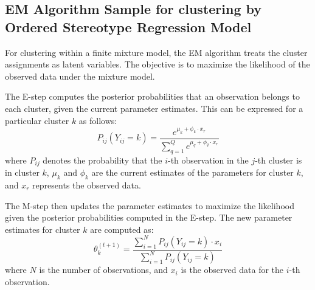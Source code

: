 \documentclass{article}
\begin{document}







\subsection{EM Algorithm Sample for clustering by Ordered Stereotype Regression Model}
For clustering within a finite mixture model, the EM algorithm treats the cluster assignments as latent variables. The objective is to maximize the likelihood of the observed data under the mixture model.

The E-step computes the posterior probabilities that an observation belongs to each cluster, given the current parameter estimates. This can be expressed for a particular cluster \( k \) as follows:
\begin{equation}
P_{ij}(Y_{ij} = k) = \frac{e^{\mu_k + \phi_k \cdot x_r}}{\sum_{q=1}^{Q} e^{\mu_q + \phi_q \cdot x_r}}
\end{equation}
where \( P_{ij} \) denotes the probability that the \( i \)-th observation in the \( j \)-th cluster is in cluster \( k \), \( \mu_k \) and \( \phi_k \) are the current estimates of the parameters for cluster \( k \), and \( x_r \) represents the observed data.

The M-step then updates the parameter estimates to maximize the likelihood given the posterior probabilities computed in the E-step. The new parameter estimates for cluster \( k \) are computed as:
\begin{equation}
\theta_{k}^{(t+1)} = \frac{\sum_{i=1}^{N} P_{ij}(Y_{ij} = k) \cdot x_{i}}{\sum_{i=1}^{N} P_{ij}(Y_{ij} = k)}
\end{equation}
where \( N \) is the number of observations, and \( x_{i} \) is the observed data for the \( i \)-th observation.
\end{document}
